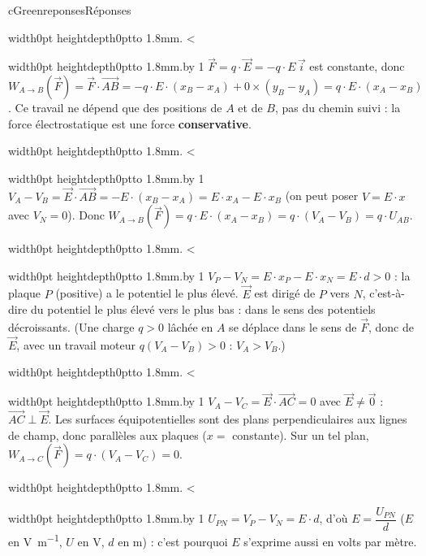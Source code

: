 \documentclass[11pt,a4paper]{article}
\newcommand{\vect}[1]{\overrightarrow{#1}}
\newif\ifeleve
\newlength{\interligne}\setlength{\interligne}{7mm}
\newlength{\replen}
\newcommand{\pointilles}{{\color{cInk2!60}\leaders\hbox to 1.8mm{\hss.\hss}\hfill}\kern0pt}
\newcommand{\lignes}[1]{\leavevmode\vrule width0pt height\dimexpr\interligne-1mm\relax depth0pt\pointilles
  \lgn=1 \loop\ifnum\lgn<#1 \par\nointerlineskip\noindent\vrule width0pt height\interligne depth0pt\pointilles\advance\lgn by 1 \repeat}
\newcommand{\rep}[1]{%
  \ifeleve
    \sbox{\repbox}{\parbox{\linewidth}{#1}}%
    \replen=\dimexpr\ht\repbox+\dp\repbox\relax
    \repn=\numexpr\replen/\baselineskip+1\relax
    \ifnum\repn<2 \repn=2\fi
    \edef\nblignes{\the\repn}\lignes{\nblignes}%
  \else #1\fi}
\newcommand{\titrereponses}{\ifeleve Mes réponses\else Réponses\fi}
\newcommand{\W}[2]{W_{#1\rightarrow #2}(\vect{F})}
\begin{document}
\begin{rub}{cGreen}{reponses}{\titrereponses}
\begin{reps}
  \item \rep{$\vect{F} = q\cdot\vect{E} = -q\cdot E\,\vect{i}$ est constante, donc $\W{A}{B} = \vect{F}\cdot\vect{AB} = -q\cdot E\cdot(x_B - x_A) + 0\times(y_B - y_A) = q\cdot E\cdot(x_A - x_B)$. Ce travail ne dépend que des positions de $A$ et de $B$, pas du chemin suivi : la force électrostatique est une force \textbf{conservative}.}
  \item \rep{$V_A - V_B = \vect{E}\cdot\vect{AB} = -E\cdot(x_B - x_A) = E\cdot x_A - E\cdot x_B$ (on peut poser $V = E\cdot x$ avec $V_N = 0$). Donc $\W{A}{B} = q\cdot E\cdot(x_A - x_B) = q\cdot(V_A - V_B) = q\cdot U_{AB}$.}
  \item \rep{$V_P - V_N = E\cdot x_P - E\cdot x_N = E\cdot d > 0$ : la plaque $P$ (positive) a le potentiel le plus élevé. $\vect{E}$ est dirigé de $P$ vers $N$, c’est-à-dire du potentiel le plus élevé vers le plus bas : dans le sens des potentiels décroissants. (Une charge $q > 0$ lâchée en $A$ se déplace dans le sens de $\vect{F}$, donc de $\vect{E}$, avec un travail moteur $q(V_A - V_B) > 0$ : $V_A > V_B$.)}
  \item \rep{$V_A - V_C = \vect{E}\cdot\vect{AC} = 0$ avec $\vect{E} \neq \vect{0}$ : $\vect{AC} \perp \vect{E}$. Les surfaces équipotentielles sont des plans perpendiculaires aux lignes de champ, donc parallèles aux plaques ($x = $ constante). Sur un tel plan, $\W{A}{C} = q\cdot(V_A - V_C) = 0$.}
  \item \rep{$U_{PN} = V_P - V_N = E\cdot d$, d’où $E = \dfrac{U_{PN}}{d}$ ($E$ en \unit{V.m^{-1}}, $U$ en V, $d$ en m) : c’est pourquoi $E$ s’exprime aussi en volts par mètre.}
\end{reps}
\end{rub}
\end{document}

